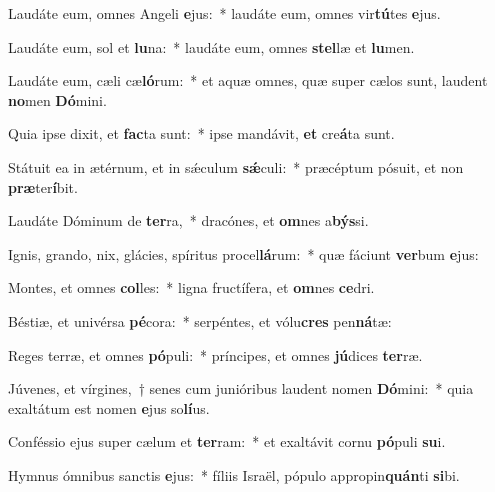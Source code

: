 \item Laudáte eum, omnes Angeli \textbf{e}jus:~* laudáte eum, omnes vir\textbf{tú}tes \textbf{e}jus.
\item Laudáte eum, sol et \textbf{lu}na:~* laudáte eum, omnes \textbf{stel}læ et \textbf{lu}men.
\item Laudáte eum, cæli cæ\textbf{ló}rum:~* et aquæ omnes, quæ super cælos sunt, laudent \textbf{no}men \textbf{Dó}mini.
\item Quia ipse dixit, et \textbf{fac}ta sunt:~* ipse mandávit, \textbf{et} cre\textbf{á}ta sunt.
\item Státuit ea in ætérnum, et in sǽculum \textbf{sǽ}culi:~* præcéptum pósuit, et non \textbf{præ}ter\textbf{í}bit.
\item Laudáte Dóminum de \textbf{ter}ra,~* dracónes, et \textbf{om}nes a\textbf{býs}si.
\item Ignis, grando, nix, glácies, spíritus procel\textbf{lá}rum:~* quæ fáciunt \textbf{ver}bum \textbf{e}jus:
\item Montes, et omnes \textbf{col}les:~* ligna fructífera, et \textbf{om}nes \textbf{ce}dri.
\item Béstiæ, et univérsa \textbf{pé}cora:~* serpéntes, et vólu\textbf{cres} pen\textbf{ná}tæ:
\item Reges terræ, et omnes \textbf{pó}puli:~* príncipes, et omnes \textbf{jú}dices \textbf{ter}ræ.
\item Júvenes, et vírgines,~† senes cum junióribus laudent nomen \textbf{Dó}mini:~* quia exaltátum est nomen \textbf{e}jus so\textbf{lí}us.
\item Conféssio ejus super cælum et \textbf{ter}ram:~* et exaltávit cornu \textbf{pó}puli \textbf{su}i.
\item Hymnus ómnibus sanctis \textbf{e}jus:~* fíliis Israël, pópulo appropin\textbf{quán}ti \textbf{si}bi.

